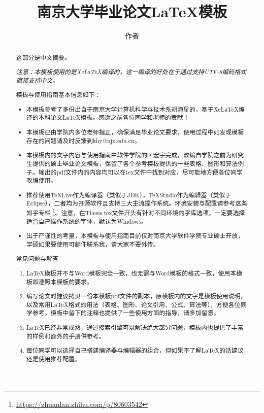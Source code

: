 \documentclass[winfonts,mf,twoside,AutoFakeBold = {2}]{njuthesis}
\title{南京大学毕业论文\LaTeX 模板}
\author{作者}
\institute{南京大学}
\begin{document}

\maketitle
\makeenglishtitle


\frontmatter

\begin{abstract}
	这部分是中文摘要。
	
	\textit{注意：本模板使用的是XeLaTeX编译的，这一编译的好处在于通过支持UTF-8编码格式直接支持中文。}
	
	模板与使用指南基本信息如下：
	\begin{itemize}
		\item 本模板参考了多份出自于南京大学计算机科学与技术系胡海星的，基于XeLaTeX编译的本科论文LaTeX模板。感谢之前各位同学和老师的贡献！
		\item 本模板已由学院内多位老师指正，确保满足毕业论文要求，使用过程中如发现模板存在的问题请及时反馈到khy@nju.edu.cn。
		\item 本模板内的文字内容与使用指南由软件学院的匡宏宇完成，改编自学院之前为研究生提供的硕士毕业论文模板，保留了各个参考模板提供的一些表格、图形和算法例子。输出的pdf文件内的内容均可以在tex文件中找到对应，尽可能地方便各位同学改编使用。
		\item 推荐使用TeXLive作为编译器（类似于JDK），TeXStudio作为编辑器（类似于Eclipse），二者均为开源软件且支持三大主流操作系统。环境安装与配置请参考这条知乎专栏 \footnote{\url{https://zhuanlan.zhihu.com/p/80603542}}。注意，在Thesis.tex文件开头有针对不同环境的字库选项，一定要选择适合自己操作系统的字体，默认为Windows。
		\item 出于严谨性的考量，本模板与使用指南目前仅对南京大学软件学院专业硕士开放，学硕如果要使用可邮件联系我，请大家不要外传。
	\end{itemize}
	
	常见问题与解答
	\begin{enumerate}
		\item LaTeX模板并不与Word模板完全一致，也无需与Word模板的格式一致，使用本模板即遵照本模板的要求。
		\item 编写论文时建议拷贝一份本模板pdf文件的副本，原模板内的文字是模板使用说明，以及常用LaTeX格式的用法（表格、图形、论文引用、公式、算法等），方便各位同学参考。模板中留下的注释也提供了一些使用方面的指导，请多加留意。
		\item LaTeX已经非常成熟，通过搜索引擎可以解决绝大部分问题，模板内也提供了丰富的样例和额外的手册供参考。
		\item 每位同学可以选择自己搭建编译器与编辑器的组合，但如果不了解LaTeX的话建议还是使用推荐配置。
	\end{enumerate}
\end{abstract}
\end{document}
